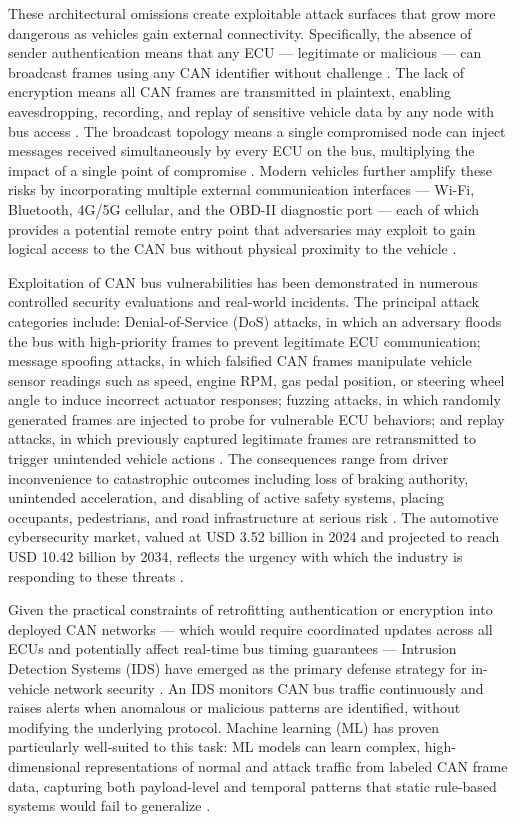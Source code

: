 \documentclass[conference]{IEEEtran}
\begin{document}
These architectural omissions create exploitable attack surfaces that grow more dangerous as vehicles gain external connectivity. Specifically, the absence of sender authentication means that any ECU — legitimate or malicious — can broadcast frames using any CAN identifier without challenge \cite{young2019canidssurvey}. The lack of encryption means all CAN frames are transmitted in plaintext, enabling eavesdropping, recording, and replay of sensitive vehicle data by any node with bus access \cite{10_1145_3431233}. The broadcast topology means a single compromised node can inject messages received simultaneously by every ECU on the bus, multiplying the impact of a single point of compromise \cite{article_avatefipour}. Modern vehicles further amplify these risks by incorporating multiple external communication interfaces — Wi-Fi, Bluetooth, 4G/5G cellular, and the OBD-II diagnostic port — each of which provides a potential remote entry point that adversaries may exploit to gain logical access to the CAN bus without physical proximity to the vehicle \cite{miller2015remote}.

Exploitation of CAN bus vulnerabilities has been demonstrated in numerous controlled security evaluations and real-world incidents. The principal attack categories include: Denial-of-Service (DoS) attacks, in which an adversary floods the bus with high-priority frames to prevent legitimate ECU communication; message spoofing attacks, in which falsified CAN frames manipulate vehicle sensor readings such as speed, engine RPM, gas pedal position, or steering wheel angle to induce incorrect actuator responses; fuzzing attacks, in which randomly generated frames are injected to probe for vulnerable ECU behaviors; and replay attacks, in which previously captured legitimate frames are retransmitted to trigger unintended vehicle actions \cite{s23073554}. The consequences range from driver inconvenience to catastrophic outcomes including loss of braking authority, unintended acceleration, and disabling of active safety systems, placing occupants, pedestrians, and road infrastructure at serious risk \cite{266537}. The automotive cybersecurity market, valued at USD 3.52 billion in 2024 and projected to reach USD 10.42 billion by 2034, reflects the urgency with which the industry is responding to these threats \cite{gmi2025automotivecybersecurity}.

Given the practical constraints of retrofitting authentication or encryption into deployed CAN networks — which would require coordinated updates across all ECUs and potentially affect real-time bus timing guarantees — Intrusion Detection Systems (IDS) have emerged as the primary defense strategy for in-vehicle network security \cite{7952095}. An IDS monitors CAN bus traffic continuously and raises alerts when anomalous or malicious patterns are identified, without modifying the underlying protocol. Machine learning (ML) has proven particularly well-suited to this task: ML models can learn complex, high-dimensional representations of normal and attack traffic from labeled CAN frame data, capturing both payload-level and temporal patterns that static rule-based systems would fail to generalize \cite{8476919}.
\end{document}
